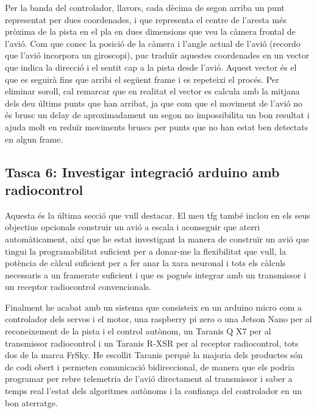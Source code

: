 \documentclass[10pt,a4paper,twocolumn,twoside]{article}
\begin{document}
Per la banda del controlador, llavors, cada dècima de segon arriba un punt representat per dues coordenades, i que representa
el centre de l'aresta més pròxima de la pista en el pla en dues dimensions que veu la càmera frontal de l'avió. Com que 
conec la posició de la càmera i l'angle actual de l'avió (recordo que l'avió incorpora un giroscopi), puc traduïr aquestes
coordenades en un vector que indica la direcció i el sentit cap a la pista desde l'avió. Aquest vector és el que es seguirà
fins que arribi el següent frame i es repeteixi el procés. Per eliminar soroll, cal remarcar que en realitat el vector es
calcula amb la mitjana dels deu últims punts que han arribat, ja que com que el moviment de l'avió no és brusc un delay de 
aproximadament un segon no impossibilita un bon resultat i ajuda molt en reduïr moviments bruscs per punts que no han
estat ben detectats en algun frame.

\subsection{Tasca 6: Investigar integració arduino amb radiocontrol}
Aquesta és la última secció que vull destacar. El meu tfg també inclou en els seus objectius opcionals construir un avió a escala i aconseguir
que aterri automàticament, així que he estat investigant la manera de construïr un avió que tingui la programabilitat suficient per a donar-me
la flexibilitat que vull, la potència de càlcul suficient per a fer anar la xara neuronal i tots els càlculs necessaris a un framerate suficient
i que es pogués integrar amb un transmissor i un receptor radiocontrol convencionals.

Finalment he acabat amb un sistema que consisteix en un arduino micro com a controlador dels servos i el motor, una raspberry pi zero o 
una Jetson Nano per al reconeixement de la pista i el control autònom, un Taranis Q X7 per al transmissor radiocontrol i un Taranis R-XSR
per al receptor radiocontrol, tots dos de la marca FrSky. He escollit Taranis perquè la majoria dels productes són de codi obert i permeten
comunicació bidireccional, de manera que els podria programar per rebre telemetria de l'avió directament al transmissor i saber a temps real
l'estat dels algoritmes autònoms i la confiança del controlador en un bon aterratge.




\end{document}
